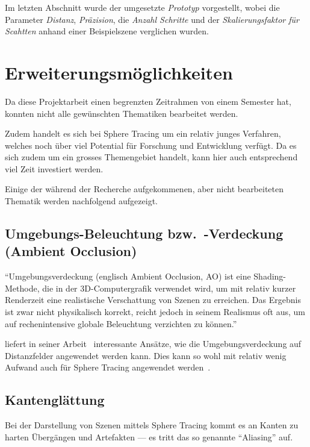 Im letzten Abschnitt wurde der umgesetzte \textit{Prototyp} vorgestellt,
wobei die Parameter \textit{Distanz}, \textit{Präzision}, die
\textit{Anzahl Schritte} und der \textit{Skalierungsfaktor für Scahtten}
anhand einer Beispielszene verglichen wurden.

\section{Erweiterungsmöglichkeiten}
\label{sec:further_work}

Da diese Projektarbeit einen begrenzten Zeitrahmen von einem Semester
hat, konnten nicht alle gewünschten Thematiken bearbeitet werden.

Zudem handelt es sich bei Sphere Tracing um ein relativ junges
Verfahren, welches noch über viel Potential für Forschung und
Entwicklung verfügt. Da es sich zudem um ein grosses Themengebiet
handelt, kann hier auch entsprechend viel Zeit investiert werden.

Einige der während der Recherche aufgekommenen, aber nicht bearbeiteten
Thematik werden nachfolgend aufgezeigt.

\subsection{Umgebungs-Beleuchtung bzw.\ -Verdeckung (Ambient Occlusion)}
\label{subsec:further_work:ambient_occlusion}

``Umgebungsverdeckung (englisch Ambient Occlusion, AO) ist eine
Shading-Methode, die in der 3D-Computergrafik verwendet wird, um mit
relativ kurzer Renderzeit eine realistische Verschattung von Szenen zu
erreichen. Das Ergebnis ist zwar nicht physikalisch korrekt, reicht
jedoch in seinem Realismus oft aus, um auf rechenintensive globale
Beleuchtung verzichten zu
können.''~\parencite{wikipedia_the_free_encyclopedia_umgebungsverdeckung_2015}

\citeauthor{evans_fast_2006} liefert in seiner
Arbeit~ interessante Ansätze, wie die
Umgebungsverdeckung auf Distanzfelder angewendet werden kann. Dies kann
so wohl mit relativ wenig Aufwand auch für Sphere Tracing angewendet
werden~\parencite{evans_fast_2006}.

\subsection{Kantenglättung}
\label{subsec:further_work:antialiasing}

Bei der Darstellung von Szenen mittels Sphere Tracing kommt es an Kanten
zu harten Übergängen und Artefakten --- es tritt das so genannte
``Aliasing'' auf.

